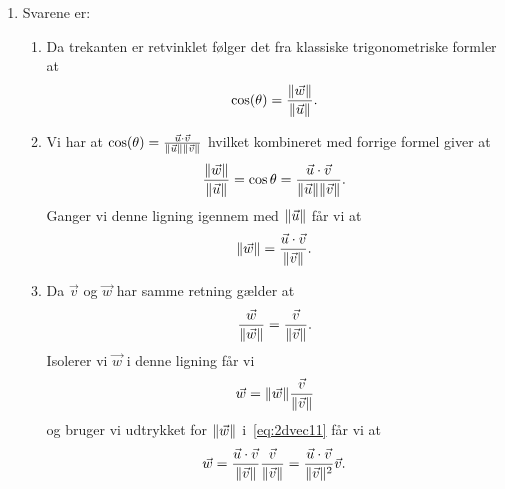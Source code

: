 \begin{enumerate}
	
%	
	
	\item\label{it:2dvec15}Svarene er:
	
	\begin{enumerate}
		\item Da trekanten er retvinklet følger det fra klassiske trigonometriske formler at
		\begin{align*}
		\cos(\theta)=\frac{\Vert \vec{w}\Vert}{\Vert \vec{u}\Vert}.
		\end{align*}
		
		\item Vi har at $\cos(\theta)=\frac{\vec{u}\cdot \vec{v}}{\Vert \vec{u}\Vert\Vert \vec{v}\Vert}$ hvilket kombineret med forrige formel giver at 
		\begin{align*}
		\frac{\Vert \vec{w}\Vert}{\Vert \vec{u}\Vert}=\cos \theta=\frac{\vec{u}\cdot \vec{v}}{\Vert \vec{u}\Vert\Vert \vec{v}\Vert}.
		\end{align*}
		Ganger vi denne ligning igennem med $\Vert \vec{u}\Vert$ får vi at		
		\begin{align}\label{eq:2dvec11}
		\Vert \vec{w}\Vert =\frac{\vec{u}\cdot \vec{v}}{\Vert \vec{v}\Vert}.
		\end{align}
		
		\item Da $\vec{v}$ og $\vec{w}$ har samme retning gælder at
		\begin{align*}
		\frac{\vec{w}}{\Vert \vec{w}\Vert}=\frac{\vec{v}}{\Vert \vec{v}\Vert}.
		\end{align*}
		Isolerer vi $\vec{w}$ i denne ligning får vi
		\begin{align*}
		\vec{w}=\Vert \vec{w}\Vert\frac{\vec{v}}{\Vert \vec{v}\Vert}
		\end{align*}
		og bruger vi udtrykket for $\Vert \vec{w}\Vert$ i~\eqref{eq:2dvec11} får vi at
		\begin{align*}
		\vec{w}=\frac{\vec{u}\cdot \vec{v}}{\Vert \vec{v}\Vert}\frac{\vec{v}}{\Vert \vec{v}\Vert}=\frac{\vec{u}\cdot \vec{v}}{\Vert \vec{v}\Vert^2}\vec{v}.
		\end{align*}
		

\end{enumerate}
\end{enumerate}

